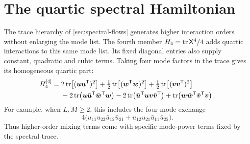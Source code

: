 \section{The quartic spectral Hamiltonian}
\label{sec:quartic-expansion}

The trace hierarchy of \cref{sec:spectral-flows} generates higher
interaction orders without enlarging the mode list.
The fourth member $H_4=\operatorname{tr}\mathsf X^4/4$ adds quartic
interactions to this same mode list. Its fixed diagonal entries
also supply constant, quadratic and cubic terms. Taking four mode factors in
the trace gives its homogeneous quartic part:
\begin{align}\label{eq:hierarchy-quartic-part}
 H_4^{[4]}={}&2\operatorname{tr}\!\left[(\boldsymbol u\bar{\boldsymbol u}^{\mathsf T})^2\right]
 +\tfrac12\operatorname{tr}\!\left[(\bar{\boldsymbol w}^{\mathsf T}\boldsymbol w)^2\right]
 +\tfrac12\operatorname{tr}\!\left[(\boldsymbol v\bar{\boldsymbol v}^{\mathsf T})^2\right]
 \nonumber\\
 &-2\operatorname{tr}\!\left(\boldsymbol u\bar{\boldsymbol u}^{\mathsf T}
                         \bar{\boldsymbol w}^{\mathsf T}\boldsymbol w\right)
  -2\operatorname{tr}\!\left(\bar{\boldsymbol u}^{\mathsf T}\boldsymbol u
                         \boldsymbol v\bar{\boldsymbol v}^{\mathsf T}\right)
  +\operatorname{tr}\!\left(\boldsymbol w\bar{\boldsymbol w}^{\mathsf T}
                         \bar{\boldsymbol v}^{\mathsf T}\boldsymbol v\right).
\end{align}
For example, when $L,M\geq2$, this includes the four-mode exchange
\[
 4\bigl(u_{11}u_{22}\bar{u}_{12}\bar{u}_{21}
       +u_{12}u_{21}\bar{u}_{11}\bar{u}_{22}\bigr).
\]
Thus higher-order mixing terms come with specific mode-power terms
fixed by the spectral trace.

